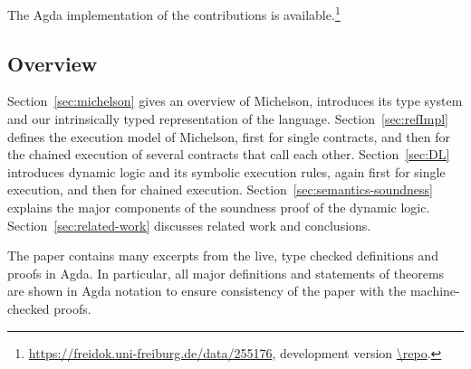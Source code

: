 The Agda implementation of the contributions is
available.\footnote{\url{https://freidok.uni-freiburg.de/data/255176},
development version  \url{\repo}.}


\subsection*{Overview}
\label{sec:overview}

Section~\ref{sec:michelson} gives an overview of Michelson, introduces
its type system and our intrinsically typed representation of the language.
Section~\ref{sec:refImpl} defines the execution model of Michelson,
first for single contracts, and then for the chained execution of
several contracts that call each other.
Section~\ref{sec:DL} introduces dynamic logic and its
symbolic execution rules, again first for single execution, and then
for chained execution.
Section~\ref{sec:semantics-soundness} explains the major components of
the soundness proof of the dynamic logic.
Section~\ref{sec:related-work} discusses related work and conclusions.

The paper contains many excerpts from the live, type checked
definitions and proofs in Agda. In particular, all major definitions
and statements of theorems are shown in Agda notation to ensure
consistency of the paper with the machine-checked proofs.




